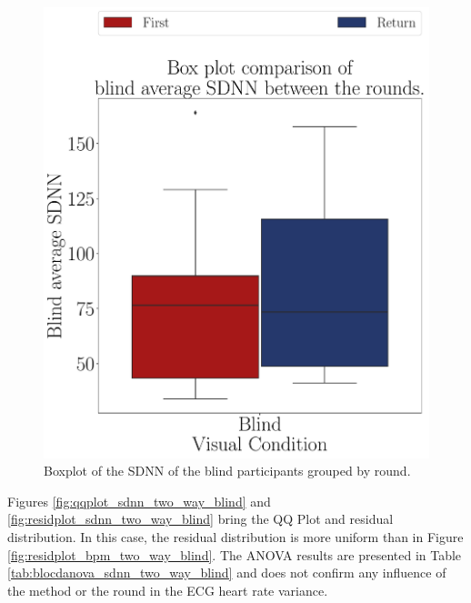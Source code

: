 \begin{figure}[!htb]
    \begin{minipage}{0.075\textwidth}
        \hfill
    \end{minipage}
    \begin{minipage}{0.45\textwidth}
        \centering
        \includegraphics[width = \textwidth]{Resultados/ECG/Figuras/pdf/boxplot_ecg_sdnn_blind_rounds.pdf}
        \caption{Boxplot of the SDNN of the blind participants grouped by round.}
        \label{fig:boxplot_ecg_sdnn_blind_rounds}
    \end{minipage}
\end{figure}


Figures \ref{fig:qqplot_sdnn_two_way_blind} and \ref{fig:residplot_sdnn_two_way_blind} bring the QQ Plot and residual distribution. In this case, the residual distribution is more uniform than in Figure \ref{fig:residplot_bpm_two_way_blind}. The ANOVA results are presented in Table \ref{tab:blocdanova_sdnn_two_way_blind} and does not confirm any influence of the method or the round in the ECG heart rate variance.

